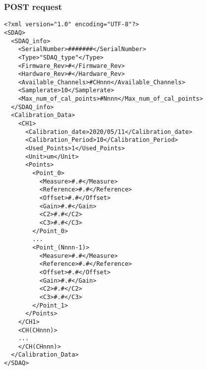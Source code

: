 \subsubsection{POST request}

\newpage
\begin{lstlisting}[frame=single,caption=Return of a GET request for Morfeas\_SDAQnet\_proxy.php,label=lst:SDAQ_calib_info]
<?xml version="1.0" encoding="UTF-8"?>
<SDAQ>
  <SDAQ_info>
    <SerialNumber>#######</SerialNumber>
    <Type>"SDAQ_type"</Type>
    <Firmware_Rev>#</Firmware_Rev>
    <Hardware_Rev>#</Hardware_Rev>
    <Available_Channels>#CHnnn</Available_Channels>
    <Samplerate>10</Samplerate>
    <Max_num_of_cal_points>#Nnnn</Max_num_of_cal_points>
  </SDAQ_info>
  <Calibration_Data>
    <CH1>
      <Calibration_date>2020/05/11</Calibration_date>
      <Calibration_Period>10</Calibration_Period>
      <Used_Points>1</Used_Points>
      <Unit>um</Unit>
      <Points>
        <Point_0>
          <Measure>#.#</Measure>
          <Reference>#.#</Reference>
          <Offset>#.#</Offset>
          <Gain>#.#</Gain>
          <C2>#.#</C2>
          <C3>#.#</C3>
        </Point_0>
        ...
        <Point_(Nnnn-1)>
          <Measure>#.#</Measure>
          <Reference>#.#</Reference>
          <Offset>#.#</Offset>
          <Gain>#.#</Gain>
          <C2>#.#</C2>
          <C3>#.#</C3>
        </Point_1>
      </Points>
    </CH1>
    <CH(CHnnn)>
    ...
    </CH(CHnnn)>
  </Calibration_Data>
</SDAQ>
\end{lstlisting}
